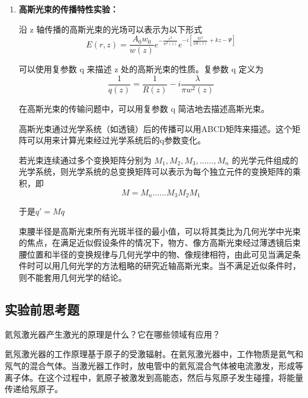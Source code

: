 \documentclass[dvipsnames, svgnames,a4paper,11pt]{article}
\begin{document}
\begin{enumerate}
		\item \textbf{高斯光束的传播特性实验：}
		
			沿 z 轴传播的高斯光束的光场可以表示为以下形式
			\[
				E(r, z) = \frac{A_0 w_0}{w(z)} e^{-\frac{r^2}{w^2(z)}} e^{-i[\frac{k r^2}{2 R(z)} + k z - \Psi]} 
			\]

			可以使用复参数 q 来描述 z 处的高斯光束的性质。复参数 q 定义为
			\[
				\frac{1}{q(z)} = \frac{1}{R(z)} - i\frac{\lambda}{\pi w^2(z)}
			\]

			在高斯光束的传输问题中，可以用复参数 q 简洁地去描述高斯光束。

			高斯光束通过光学系统（如透镜）后的传播可以用ABCD矩阵来描述。这个矩阵可以用来计算光束经过光学系统后的q参数变化。
			
			若光束连续通过多个变换矩阵分别为 $M_1, M_2, M_3, …… , M_n$ 的光学元件组成的光学系统，则光学系统的总变换矩阵可以表示为每个独立元件的变换矩阵的乘积，即
			\[
				M = M_n …… M_3 M_2 M_1
			\]

			于是$q' = M q$


			束腰半径是高斯光束所有光斑半径的最小值，可以将其类比为几何光学中光束的焦点，在满足近似假设条件的情况下，物方、像方高斯光束经过薄透镜后束腰位置和半径的变换规律与几何光学中的物、像规律相符，由此可见当满足条件时可以用几何光学的方法粗略的研究近轴高斯光束。当不满足近似条件时，则不能套用几何光学的结论。



	\end{enumerate}
	




\subsection{实验前思考题}

\begin{question}
	氦氖激光器产生激光的原理是什么？它在哪些领域有应用？
\end{question}

	氦氖激光器的工作原理基于原子的受激辐射。在氦氖激光器中，工作物质是氦气和氖气的混合气体。当激光器工作时，放电管中的氦氖混合气体被电流激发，形成等离子体。在这个过程中，氦原子被激发到高能态，然后与氖原子发生碰撞，将能量传递给氖原子。
\end{document}
